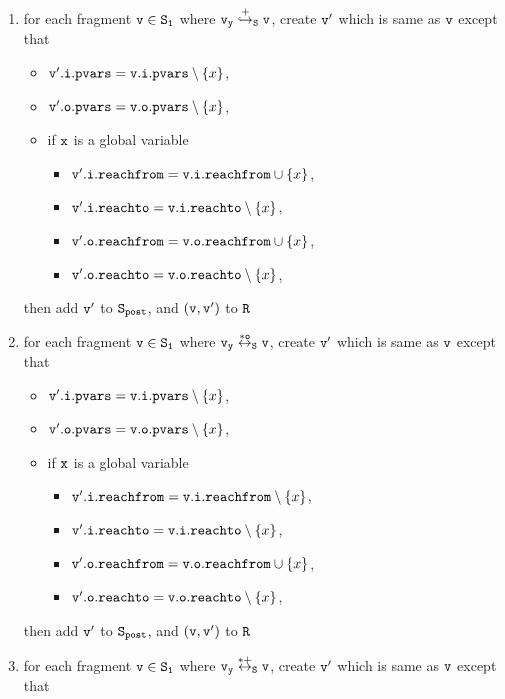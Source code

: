 \begin{itemize}
\begin{enumerate}
\item for each fragment $\tt v \in S_1$ where $\tt v_y \overset{+}\hookrightarrow_S v$, create $\tt v'$ which is same as $\tt v$ except that
\begin{itemize}
\item $\mathtt{v}'.\mathtt{i}.\mathtt{pvars} = \mathtt{v}.\mathtt{i}.\mathtt{pvars} \setminus \left\{x\right\}$,
\item $\mathtt{v}'.\mathtt{o}.\mathtt{pvars} = \mathtt{v}.\mathtt{o}.\mathtt{pvars} \setminus \left\{x\right\}$,
\item if $\tt x$ is a global variable
\begin{itemize}
\item $\mathtt{v}'.\mathtt{i}.\mathtt{reachfrom} = \mathtt{v}.\mathtt{i}.\mathtt{reachfrom} \cup \left\{x\right\}$,
\item $\mathtt{v}'.\mathtt{i}.\mathtt{reachto} = \mathtt{v}.\mathtt{i}.\mathtt{reachto} \setminus \left\{x\right\}$,
 \item $\mathtt{v}'.\mathtt{o}.\mathtt{reachfrom} = \mathtt{v}.\mathtt{o}.\mathtt{reachfrom} \cup \left\{x\right\}$,
 \item $\mathtt{v}'.\mathtt{o}.\mathtt{reachto} = \mathtt{v}.\mathtt{o}.\mathtt{reachto} \setminus \left\{x\right\}$,
\end{itemize}
\end{itemize}
then add $\tt v'$ to $\tt S_{post}$, and $\tt (v,v')$ to $\tt R$
\item for each fragment $\tt v \in S_1$ where $\tt v_y \overset{*o}\leftrightarrow_S v$, create $\tt v'$ which is same as $\tt v$ except that
\begin{itemize}
\item $\mathtt{v}'.\mathtt{i}.\mathtt{pvars} = \mathtt{v}.\mathtt{i}.\mathtt{pvars} \setminus \left\{x\right\}$,
\item $\mathtt{v}'.\mathtt{o}.\mathtt{pvars} = \mathtt{v}.\mathtt{o}.\mathtt{pvars} \setminus \left\{x\right\}$,
\item if $\tt x$ is a global variable
\begin{itemize}
\item $\mathtt{v}'.\mathtt{i}.\mathtt{reachfrom} = \mathtt{v}.\mathtt{i}.\mathtt{reachfrom} \setminus \left\{x\right\}$,
\item $\mathtt{v}'.\mathtt{i}.\mathtt{reachto} = \mathtt{v}.\mathtt{i}.\mathtt{reachto} \setminus \left\{x\right\}$,
\item $\mathtt{v}'.\mathtt{o}.\mathtt{reachfrom} = \mathtt{v}.\mathtt{o}.\mathtt{reachfrom} \cup \left\{x\right\}$,
\item $\mathtt{v}'.\mathtt{o}.\mathtt{reachto} = \mathtt{v}.\mathtt{o}.\mathtt{reachto} \setminus \left\{x\right\}$,
\end{itemize}
\end{itemize}
then add $\tt v'$ to $\tt S_{post}$, and $\tt (v,v')$ to $\tt R$
\item for each fragment $\tt v \in S_1$ where $\tt v_y \overset{*+}\leftrightarrow_S v$, create $\tt v'$ which is same as $\tt v$ except that 

\end{enumerate}
\end{itemize}
